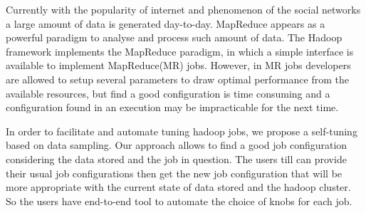 Currently with the popularity of internet and phenomenon of the social
networks a large amount of data is generated day-to-day. MapReduce appears as a
powerful paradigm to analyse and process such amount of data. The Hadoop framework
implements the MapReduce paradigm, in which a simple interface is available to
implement MapReduce(MR) jobs. However, in MR jobs developers are allowed to setup several
parameters to draw optimal performance from the available resources, but find a
good configuration is time consuming and a configuration found in an execution
may be impracticable for the next time.

In order to facilitate and automate tuning hadoop jobs, we propose a self-tuning
based on data sampling. Our approach allows to find a good job configuration considering
the data stored and the job in question. The users till can provide their usual
job configurations then get the new job configuration that will be more appropriate
with the current state of data stored and the hadoop cluster. So the users have
end-to-end tool to automate the choice of knobs for each job.
